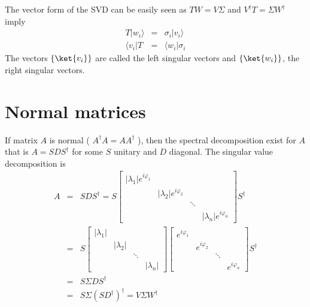 \documentclass[11pt,oneside,final]{huthesis}%
\begin{document}
The vector form of the SVD can be easily seen as  $TW=V\Sigma$ and  $V^\dagger T=\Sigma W^\dagger$ imply 
\begin{eqnarray}
  T|w_i\rangle&=& \sigma_i|v_i\rangle\\
  \langle v_i | T&=& \langle w_i|\sigma_i
\end{eqnarray}
The vectors $\{\ket{v_i}\}$ are called the left singular vectors and $\{\ket{w_i}\}$, the right singular vectors. 

\section{Normal matrices}

If matrix $A$ is normal ( $A^\dagger A=AA^\dagger$ ), then the spectral decomposition exist for $A$ that is $A=SDS^\dagger$ for some $S$ unitary and $D$ diagonal.  The singular value decomposition is
\begin{eqnarray}
	A&=& SDS^\dagger=S\left[\begin{array}{llcl}|\lambda_1|e^{i\varphi_1}&& & \\
						                    &|\lambda_2|e^{i\varphi_2}&  & \\
								    &	&\ddots& \\&& &|\lambda_n|e^{i \varphi_n} \end{array}\right]S^\dagger\\
  	 &=& S\left[\begin{array}{llcl}|\lambda_1|&& & \\
						                    &|\lambda_2|&  & \\
									&	&\ddots& \\&& &|\lambda_n| \end{array}\right]\left[\begin{array}{llcl}e^{i\varphi_1}&& & \\
						                    &e^{i\varphi_2}&  & \\
									&	&\ddots& \\&& &e^{i \varphi_n} \end{array}\right]S^\dagger\\
									&=& S\Sigma D S^\dagger\\
									&=& S\Sigma (SD^\dagger)^\dagger=V\Sigma W^\dagger
\end{eqnarray}
\end{document}
